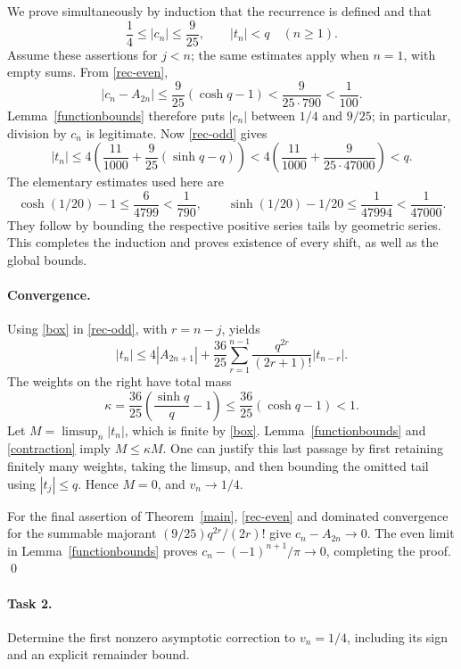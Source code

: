 \documentclass[11pt]{article}
\begin{document}
We prove simultaneously by induction that the recurrence is defined
and that
\begin{equation}\label{box}
 \frac14\le |c_n|\le\frac9{25},\qquad |t_n|<q
 \quad(n\ge1).
\end{equation}
Assume these assertions for \(j<n\); the same estimates apply when
\(n=1\), with empty sums. From \eqref{rec-even},
\[
 |c_n-A_{2n}|\le\frac9{25}(\cosh q-1)
 <\frac9{25\cdot790}<\frac1{100}.
\]
Lemma~\ref{functionbounds} therefore puts \(|c_n|\) between \(1/4\)
and \(9/25\); in particular, division by \(c_n\) is legitimate.
Now \eqref{rec-odd} gives
\[
 |t_n|\le
 4\left(\frac{11}{1000}+\frac9{25}(\sinh q-q)\right)
 <4\left(\frac{11}{1000}+\frac9{25\cdot47000}\right)<q.
\]
The elementary estimates used here are
\[
 \cosh(1/20)-1\le\frac6{4799}<\frac1{790},
 \qquad
 \sinh(1/20)-1/20\le\frac1{47994}<\frac1{47000}.
\]
They follow by bounding the respective positive series tails
by geometric series. This completes the induction and proves
existence of every shift, as well as the global bounds.

\paragraph{Convergence.}
Using \eqref{box} in \eqref{rec-odd}, with \(r=n-j\), yields
\begin{equation}\label{contraction}
 |t_n|\le4|A_{2n+1}|+
 \frac{36}{25}\sum_{r=1}^{n-1}
           \frac{q^{2r}}{(2r+1)!}|t_{n-r}|.
\end{equation}
The weights on the right have total mass
\[
 \kappa=\frac{36}{25}
       \left(\frac{\sinh q}{q}-1\right)
 \le\frac{36}{25}(\cosh q-1)<1.
\]
Let \(M=\limsup_n|t_n|\), which is finite by \eqref{box}.
Lemma~\ref{functionbounds} and \eqref{contraction} imply \(M\le\kappa M\).
One can justify this last passage by first retaining finitely many
weights, taking the limsup, and then bounding the omitted tail
using \(|t_j|\le q\). Hence \(M=0\), and \(v_n\to1/4\).

For the final assertion of Theorem~\ref{main}, \eqref{rec-even}
and dominated convergence for the summable majorant
\((9/25)q^{2r}/(2r)!\) give \(c_n-A_{2n}\to0\).
The even limit in Lemma~\ref{functionbounds} proves
\(c_n-(-1)^{n+1}/\pi\to0\), completing the proof.
\qed

\paragraph{Task 2.}
Determine the first nonzero asymptotic correction to \(v_n=1/4\),
including its sign and an explicit remainder bound.
\end{document}
